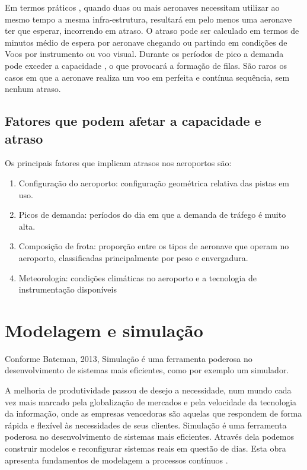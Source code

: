 \documentclass[12pt]{article}
\begin{document}
Em termos práticos , quando duas ou mais aeronaves necessitam utilizar ao
mesmo tempo a mesma infra-estrutura, resultará em pelo menos uma aeronave 
ter que esperar, incorrendo em atraso. O atraso pode ser calculado em termos
de minutos médio de espera por aeronave chegando ou partindo em condições 
de Voos por instrumento ou voo visual. Durante os períodos de pico a demanda
pode exceder a capacidade , o que provocará a formação de filas. São raros
os casos em que a aeronave realiza um voo em perfeita e contínua sequência,
sem nenhum atraso. 

\subsection{Fatores que podem afetar a capacidade e atraso}

Os principais fatores que implicam atrasos nos aeroportos são:


\begin{enumerate}
  
  \item Configuração do aeroporto: configuração geométrica relativa das pistas 
    em uso.

  \item Picos de demanda: períodos do dia em que a demanda de tráfego é muito
    alta.

  \item Composição de frota: proporção entre os tipos de aeronave que operam no 
  aeroporto, classificadas principalmente por peso e envergadura.

  \item Meteorologia: condições climáticas no aeroporto e a tecnologia de 
  instrumentação disponíveis

\end{enumerate}

\section{Modelagem e simulação}

Conforme Bateman, 2013, Simulação é uma ferramenta poderosa no 
desenvolvimento de sistemas mais eficientes, como por exemplo um simulador.

A melhoria de produtividade passou de desejo a necessidade, num mundo cada 
vez mais marcado pela globalização de mercados e pela velocidade da
tecnologia da informação, onde as empresas vencedoras são aquelas que
respondem de forma rápida e flexível às necessidades de seus clientes.
Simulação é uma ferramenta poderosa no desenvolvimento de sistemas mais
eficientes. Através dela podemos construir modelos e reconfigurar
sistemas reais em questão de dias. Esta obra apresenta fundamentos de
modelagem a processos contínuos \cite{Bateman:13}.
\end{document}
